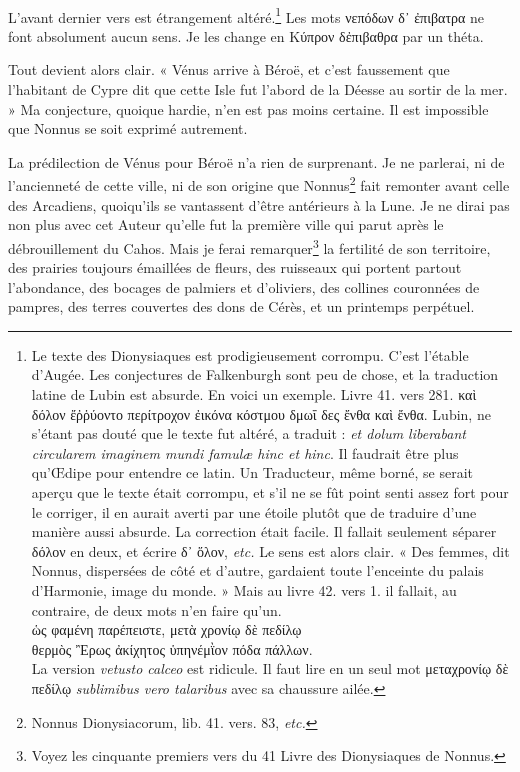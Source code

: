 \documentclass[a4paper, 18pt, oneside]{article}
\begin{document}
\paragraph{}
L'avant dernier vers est étrangement altéré.\footnote{Le texte des Dionysiaques est prodigieusement corrompu. C'est l'étable d'Augée. Les conjectures de Falkenburgh sont peu de chose, et la traduction latine de Lubin est absurde. En voici un exemple. Livre 41. vers 281. καὶ δόλον ἔῤῥύοντο περίτροχον ἐικόνα κόστμου δμωΐ δες ἔνθα καὶ ἔνθα. Lubin, ne s'étant pas douté que le texte fut altéré, a traduit : \emph{et dolum liberabant circularem imaginem mundi famulæ hinc et hinc}. Il faudrait être plus qu'Œdipe pour entendre ce latin. Un Traducteur, même borné, se serait aperçu que le texte était corrompu, et s'il ne se fût point senti assez fort pour le corriger, il en aurait averti par une étoile plutôt que de traduire d'une manière aussi absurde. La correction était facile. Il fallait seulement séparer δόλον en deux, et écrire δ᾿ ὅλον, \emph{etc.} Le sens est alors clair. « Des femmes, dit Nonnus, dispersées de côté et d'autre, gardaient toute l'enceinte du palais d'Harmonie, image du monde. » Mais au livre 42. vers 1. il fallait, au contraire, de deux mots n'en faire qu'un.\\\hspace*{10mm}ὡς φαμένη παρέπειστε, μετὰ χρονίῳ δὲ πεδίλῳ\\\hspace*{10mm}θερμὸς Ἒρως ἀκίχητος ὑπηνέμῒον πόδα πάλλων.\\\hspace*{5mm}La version \emph{vetusto calceo} est ridicule. Il faut lire en un seul mot μεταχρονίῳ δὲ πεδίλῳ \emph{sublimibus vero talaribus} avec sa chaussure ailée.} Les mots νεπόδων δ᾽ ἐπιβατρα ne font absolument aucun sens. Je les change en Κύπρον δἐπιβαθρα par un théta.

Tout devient alors clair. « Vénus arrive à Béroë, et c'est faussement que l'habitant de Cypre dit que cette Isle fut l'abord de la Déesse au sortir de la mer. » Ma conjecture, quoique hardie, n'en est pas moins certaine. Il est impossible que Nonnus se soit exprimé autrement.

La prédilection de Vénus pour Béroë n'a rien de surprenant. Je ne parlerai, ni de l'ancienneté de cette ville, ni de son origine que Nonnus\footnote{Nonnus Dionysiacorum, lib. 41. vers. 83, \emph{etc.}} fait remonter avant celle des Arcadiens, quoiqu'ils se vantassent d'être antérieurs à la Lune. Je ne dirai pas non plus avec cet Auteur qu'elle fut la première ville qui parut après le débrouillement du Cahos. Mais je ferai remarquer\footnote{Voyez les cinquante premiers vers du 41 Livre des Dionysiaques de Nonnus.} la fertilité de son territoire, des prairies toujours émaillées de fleurs, des ruisseaux qui portent partout l'abondance, des bocages de palmiers et d'oliviers, des collines couronnées de pampres, des terres couvertes des dons de Cérès, et un printemps perpétuel.
\end{document}
